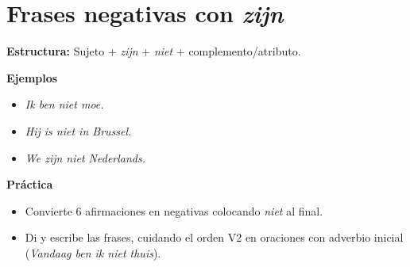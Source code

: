 \section{Frases negativas con \textit{zijn}}
\textbf{Estructura:} Sujeto + \textit{zijn} + \textit{niet} + complemento/atributo.

\textbf{Ejemplos}
\begin{itemize}[leftmargin=*]
  \item \textit{Ik ben niet moe.}
  \item \textit{Hij is niet in Brussel.}
  \item \textit{We zijn niet Nederlands.}
\end{itemize}

\textbf{Práctica}
\begin{itemize}[leftmargin=*]
  \item Convierte 6 afirmaciones en negativas colocando \textit{niet} al final.
  \item Di y escribe las frases, cuidando el orden V2 en oraciones con adverbio inicial (\textit{Vandaag ben ik niet thuis}).
\end{itemize}
